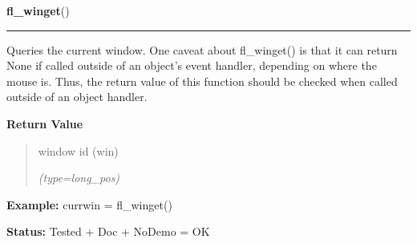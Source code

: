 \hspace{.8\funcindent}\begin{boxedminipage}{\funcwidth}

    \raggedright \textbf{fl\_winget}()

    \vspace{-1.5ex}

    \rule{\textwidth}{0.5\fboxrule}
\setlength{\parskip}{2ex}
    Queries the current window. One caveat about fl\_winget() is that it 
    can return None if called outside of an object's event handler, 
    depending on where the mouse is. Thus, the return value of this 
    function should be checked when called outside of an object handler.

\setlength{\parskip}{1ex}
      \textbf{Return Value}
    \vspace{-1ex}

      \begin{quote}
      window id (win)

      {\it (type=long\_pos)}

      \end{quote}

\textbf{Example:} currwin = fl\_winget()



\textbf{Status:} Tested + Doc + NoDemo = OK



    \end{boxedminipage}

    \label{xformslib:flxbasic:fl_iconify}

    \vspace{0.5ex}

